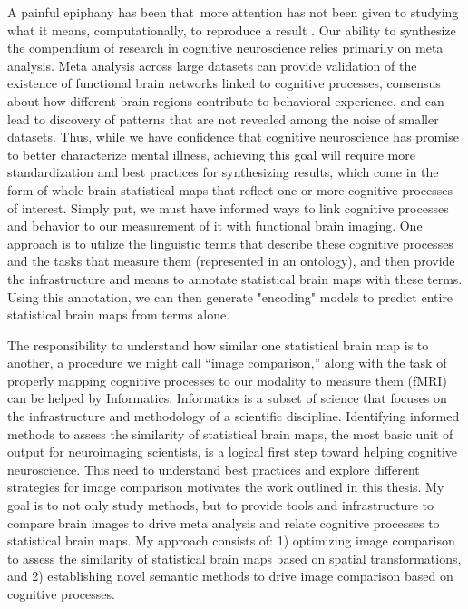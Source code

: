 \documentclass{report}
\begin{document}
A painful epiphany has been that~more attention has not been given to studying what it means, computationally, to reproduce a
result \cite{Open_Science_Collaboration2015-hb}. Our ability to synthesize the compendium of research in cognitive neuroscience relies primarily on meta analysis. Meta analysis across large datasets can provide validation of the existence of functional brain networks linked to cognitive processes, consensus about how different brain regions contribute to behavioral experience, and can lead to discovery of patterns that are not revealed among the noise of smaller datasets. Thus, while we have confidence that cognitive neuroscience has promise to better characterize mental illness, achieving this goal will require more standardization and best practices for synthesizing results, which come in the form of whole-brain statistical maps that reflect one or more cognitive processes of interest. Simply put, we must have informed ways to link cognitive processes and behavior to our measurement of it with functional brain imaging.  One approach is to utilize the linguistic terms that describe these cognitive processes and the tasks that measure them (represented in an ontology), and then provide the infrastructure and means to annotate statistical brain maps with these terms. Using this annotation, we can then generate "encoding" models to predict entire statistical brain maps from terms alone.  

The responsibility to understand how similar one statistical brain map is to another, a procedure we might call ``image comparison,'' along with the task of properly mapping cognitive processes to our modality to measure them (fMRI) can be helped by Informatics.  Informatics is a subset of science that focuses on the infrastructure and methodology of a scientific discipline. Identifying informed methods to assess the similarity of statistical brain maps, the most basic unit of output for neuroimaging scientists, is a logical first step toward helping cognitive neuroscience. This need to understand best practices and explore different strategies for image comparison motivates the work outlined in this thesis. My goal is to not only study methods, but to provide tools and infrastructure to compare brain images to drive meta analysis and relate cognitive processes to statistical brain maps. My approach consists of: 1) optimizing image comparison to assess the similarity of statistical brain maps based on spatial transformations, and 2) establishing novel semantic methods to drive image comparison based on cognitive processes. 
\end{document}
